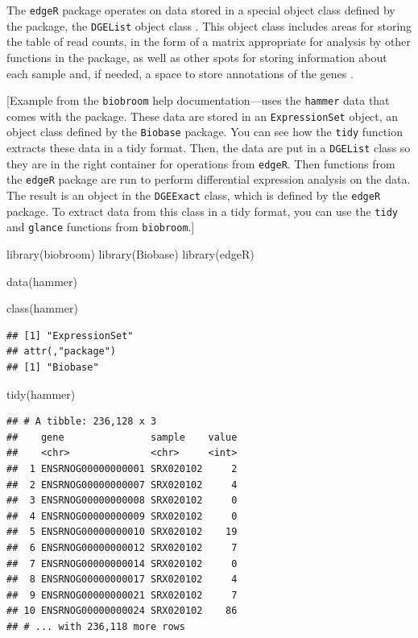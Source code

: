 \documentclass[]{tufte-book}
\newenvironment{Shaded}{}{}
\newcommand{\FunctionTok}[1]{\textcolor[rgb]{0.02,0.16,0.49}{#1}}
\newcommand{\NormalTok}[1]{#1}
\begin{document}
The \texttt{edgeR} package operates on data stored in a special object class
defined by the package, the \texttt{DGEList} object class \citep{chen2014edger}.
This object class includes areas for storing the table of read counts,
in the form of a matrix appropriate for analysis by other functions in
the package, as well as other spots for storing information about each
sample and, if needed, a space to store annotations of the genes
\citep{chen2014edger}.

{[}Example from the \texttt{biobroom} help documentation---uses the \texttt{hammer} data
that comes with the package. These data are stored in an \texttt{ExpressionSet}
object, an object class defined by the \texttt{Biobase} package. You can see how the \texttt{tidy} function extracts these data in a
tidy format. Then, the data are put in a \texttt{DGEList} class so they are in
the right container for operations from \texttt{edgeR}. Then functions from the
\texttt{edgeR} package are run to perform differential expression analysis on the
data. The result is an object in the \texttt{DGEExact} class, which is defined
by the \texttt{edgeR} package. To extract data from this class in a tidy format,
you can use the \texttt{tidy} and \texttt{glance} functions from \texttt{biobroom}.{]}

\begin{Shaded}
\begin{Highlighting}[]
\FunctionTok{library}\NormalTok{(biobroom)}
\FunctionTok{library}\NormalTok{(Biobase)}
\FunctionTok{library}\NormalTok{(edgeR)}

\FunctionTok{data}\NormalTok{(hammer)}

\FunctionTok{class}\NormalTok{(hammer)}
\end{Highlighting}
\end{Shaded}

\begin{verbatim}
## [1] "ExpressionSet"
## attr(,"package")
## [1] "Biobase"
\end{verbatim}

\begin{Shaded}
\begin{Highlighting}[]
\FunctionTok{tidy}\NormalTok{(hammer)}
\end{Highlighting}
\end{Shaded}

\begin{verbatim}
## # A tibble: 236,128 x 3
##    gene               sample    value
##    <chr>              <chr>     <int>
##  1 ENSRNOG00000000001 SRX020102     2
##  2 ENSRNOG00000000007 SRX020102     4
##  3 ENSRNOG00000000008 SRX020102     0
##  4 ENSRNOG00000000009 SRX020102     0
##  5 ENSRNOG00000000010 SRX020102    19
##  6 ENSRNOG00000000012 SRX020102     7
##  7 ENSRNOG00000000014 SRX020102     0
##  8 ENSRNOG00000000017 SRX020102     4
##  9 ENSRNOG00000000021 SRX020102     7
## 10 ENSRNOG00000000024 SRX020102    86
## # ... with 236,118 more rows
\end{verbatim}
\end{document}
